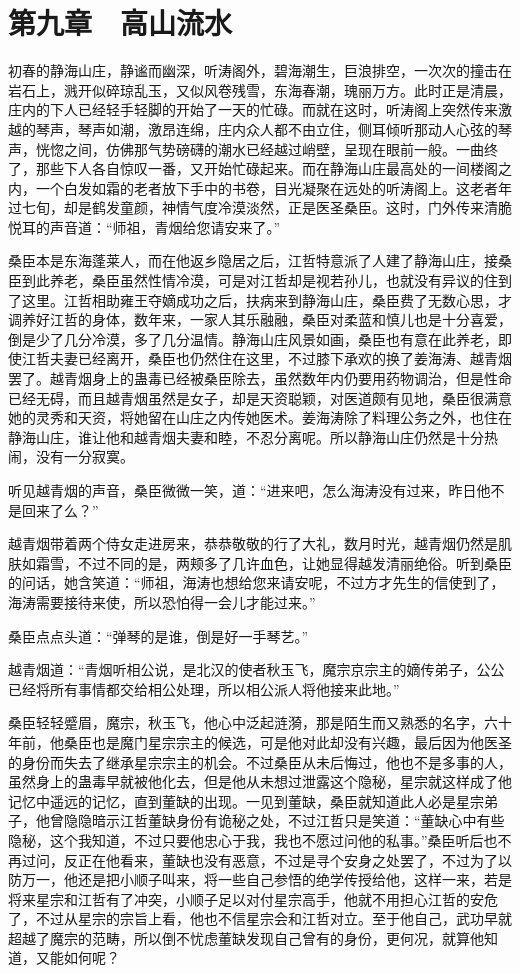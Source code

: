 \chapter{第九章　高山流水}

初春的静海山庄，静谧而幽深，听涛阁外，碧海潮生，巨浪排空，一次次的撞击在岩石上，溅开似碎琼乱玉，又似风卷残雪，东海春潮，瑰丽万方。此时正是清晨，庄内的下人已经轻手轻脚的开始了一天的忙碌。而就在这时，听涛阁上突然传来激越的琴声，琴声如潮，激昂连绵，庄内众人都不由立住，侧耳倾听那动人心弦的琴声，恍惚之间，仿佛那气势磅礴的潮水已经越过峭壁，呈现在眼前一般。一曲终了，那些下人各自惊叹一番，又开始忙碌起来。而在静海山庄最高处的一间楼阁之内，一个白发如霜的老者放下手中的书卷，目光凝聚在远处的听涛阁上。这老者年过七旬，却是鹤发童颜，神情气度冷漠淡然，正是医圣桑臣。这时，门外传来清脆悦耳的声音道：“师祖，青烟给您请安来了。”

桑臣本是东海蓬莱人，而在他返乡隐居之后，江哲特意派了人建了静海山庄，接桑臣到此养老，桑臣虽然性情冷漠，可是对江哲却是视若孙儿，也就没有异议的住到了这里。江哲相助雍王夺嫡成功之后，扶病来到静海山庄，桑臣费了无数心思，才调养好江哲的身体，数年来，一家人其乐融融，桑臣对柔蓝和慎儿也是十分喜爱，倒是少了几分冷漠，多了几分温情。静海山庄风景如画，桑臣也有意在此养老，即使江哲夫妻已经离开，桑臣也仍然住在这里，不过膝下承欢的换了姜海涛、越青烟罢了。越青烟身上的蛊毒已经被桑臣除去，虽然数年内仍要用药物调治，但是性命已经无碍，而且越青烟虽然是女子，却是天资聪颖，对医道颇有见地，桑臣很满意她的灵秀和天资，将她留在山庄之内传她医术。姜海涛除了料理公务之外，也住在静海山庄，谁让他和越青烟夫妻和睦，不忍分离呢。所以静海山庄仍然是十分热闹，没有一分寂寞。

听见越青烟的声音，桑臣微微一笑，道：“进来吧，怎么海涛没有过来，昨日他不是回来了么？”

越青烟带着两个侍女走进房来，恭恭敬敬的行了大礼，数月时光，越青烟仍然是肌肤如霜雪，不过不同的是，两颊多了几许血色，让她显得越发清丽绝俗。听到桑臣的问话，她含笑道：“师祖，海涛也想给您来请安呢，不过方才先生的信使到了，海涛需要接待来使，所以恐怕得一会儿才能过来。”

桑臣点点头道：“弹琴的是谁，倒是好一手琴艺。”

越青烟道：“青烟听相公说，是北汉的使者秋玉飞，魔宗京宗主的嫡传弟子，公公已经将所有事情都交给相公处理，所以相公派人将他接来此地。”

桑臣轻轻蹙眉，魔宗，秋玉飞，他心中泛起涟漪，那是陌生而又熟悉的名字，六十年前，他桑臣也是魔门星宗宗主的候选，可是他对此却没有兴趣，最后因为他医圣的身份而失去了继承星宗宗主的机会。不过桑臣从未后悔过，他也不是多事的人，虽然身上的蛊毒早就被他化去，但是他从未想过泄露这个隐秘，星宗就这样成了他记忆中遥远的记忆，直到董缺的出现。一见到董缺，桑臣就知道此人必是星宗弟子，他曾隐隐暗示江哲董缺身份有诡秘之处，不过江哲只是笑道：“董缺心中有些隐秘，这个我知道，不过只要他忠心于我，我也不愿过问他的私事。”桑臣听后也不再过问，反正在他看来，董缺也没有恶意，不过是寻个安身之处罢了，不过为了以防万一，他还是把小顺子叫来，将一些自己参悟的绝学传授给他，这样一来，若是将来星宗和江哲有了冲突，小顺子足以对付星宗高手，他就不用担心江哲的安危了，不过从星宗的宗旨上看，他也不信星宗会和江哲对立。至于他自己，武功早就超越了魔宗的范畴，所以倒不忧虑董缺发现自己曾有的身份，更何况，就算他知道，又能如何呢？

